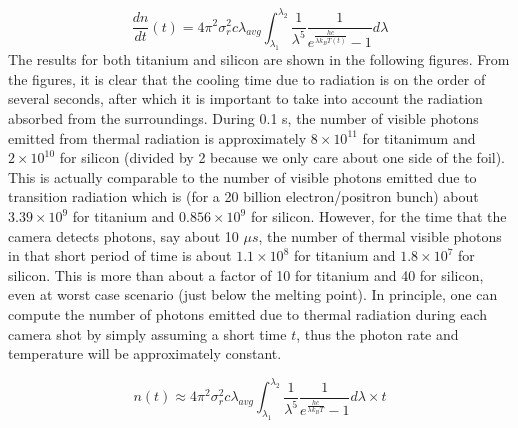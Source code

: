 \documentclass[12pt]{article}
\begin{document}
\begin{equation}
\frac{dn}{dt}(t)=4 \pi^2 \sigma_r^2 c \lambda_{avg} \int_{\lambda_1}^{\lambda_2} \frac{1}{\lambda^{5}} \frac{1}{e^{\frac{hc}{\lambda k_B T(t)}}-1} d \lambda
\end{equation}
The results for both titanium and silicon are shown in the following figures. From the figures, it is clear that the cooling time due to radiation is on the order of several seconds, after which it is important to take into account the radiation absorbed from the surroundings. During 0.1 s, the number of visible photons emitted from thermal radiation is approximately $8 \times 10^{11}$ for titanimum and $2 \times 10^{10}$ for silicon (divided by 2 because we only care about one side of the foil). This is actually comparable to the number of visible photons emitted due to transition radiation which is (for a 20 billion electron/positron bunch) about $3.39 \times 10^9$ for titanium and $0.856 \times 10^9$ for silicon. However, for the time that the camera detects photons, say about 10 $\mu s$, the number of thermal visible photons in that short period of time is about $1.1 \times 10^8$ for titanium and $1.8 \times 10^7$ for silicon. This is more than about a factor of 10 for titanium and 40 for silicon, even at worst case scenario (just below the melting point). In principle, one can compute the number of photons emitted due to thermal radiation during each camera shot by simply assuming a short time $t$, thus the photon rate and temperature will be approximately constant.

\begin{equation}
n(t) \approx 4 \pi^2 \sigma_r^2 c \lambda_{avg} \int_{\lambda_1}^{\lambda_2} \frac{1}{\lambda^{5}} \frac{1}{e^{\frac{hc}{\lambda k_B T}}-1} d \lambda \times t
\end{equation}
\end{document}
